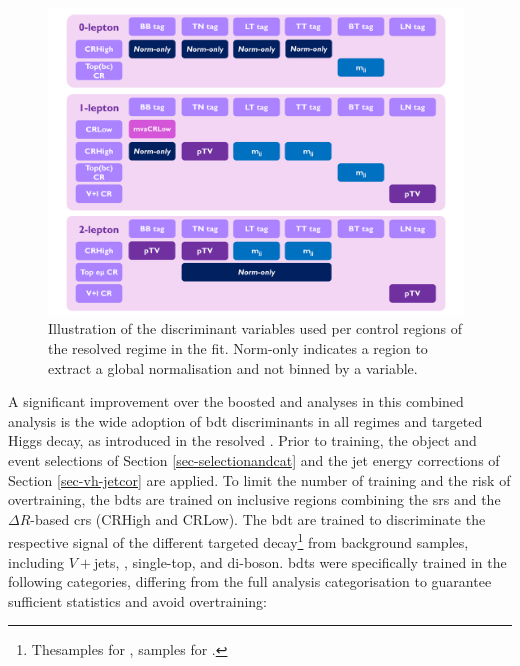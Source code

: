 \begin{figure}[h!]
  \center
  \includegraphics[width=0.98\textwidth]{Images/VH/Discriminants/Variables.pdf}
  \caption{Illustration of the discriminant variables used per control regions of the resolved regime in the fit. Norm-only indicates a region to extract a global normalisation and not binned by a variable.} %
  \label{fig:variablesControlReg}
\end{figure}

A significant improvement over the boosted \vhb and \vhc analyses in this combined analysis is the wide adoption of \gls{bdt} discriminants in all regimes and targeted Higgs decay, as introduced in the resolved \vhb \cite{ATLAS:2020fcp}. Prior to training, the object and event selections of Section \ref{sec-selectionandcat} and the jet energy corrections of Section \ref{sec-vh-jetcor} are applied. To limit the number of training and the risk of overtraining, the \gls{bdt}s are trained on inclusive regions combining the \gls{sr}s and the $\Delta R$-based \gls{cr}s (CRHigh and CRLow). The \gls{bdt} are trained to discriminate the respective signal of the different targeted decay\footnote{The\vhb samples for \vhb, \vhc samples for \vhc.} from background samples, including $V+$jets, \ttb, single-top, and di-boson. \gls{bdt}s were specifically trained in the following categories, differing from the full analysis categorisation to guarantee sufficient statistics and avoid overtraining:

